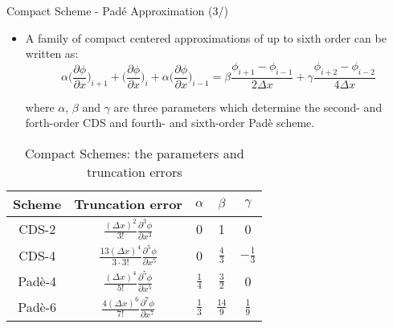 \begin{frame}{Compact Scheme - Pad\'e Approximation (3/)}

\begin{itemize}
    \item A family of compact centered approximations of up to sixth order can be written as:
    \[\alpha \bigg( \frac{\partial \phi}{\partial x}\bigg)_{i+1} + \bigg( \frac{\partial \phi}{\partial x}\bigg)_{i} + \alpha \bigg( \frac{\partial \phi}{\partial x}\bigg)_{i-1} = \beta \frac{\phi_{i+1}-\phi_{i-1}}{2\Delta x} + \gamma \frac{\phi_{i+2}-\phi_{i-2}}{4\Delta x}\]
    
    where $\alpha$, $\beta$ and $\gamma$ are three parameters which determine the second- and forth-order CDS and fourth- and sixth-order Pad\`e scheme.
\end{itemize}

\begin{table}[H]
    \centering
    \begin{tabular}{ccccc} \toprule
        Scheme      & Truncation error  & $\alpha$  & $\beta$   & $\gamma$ \\ \midrule
        CDS-2       & $\frac{(\Delta x)^{2}}{3!}\frac{\partial^{3}\phi}{\partial x^{3}}$    & 0 & 1 & 0 \\ [.5em]
        CDS-4       & $\frac{13(\Delta x)^{4}}{3 \cdot 3!}\frac{\partial^{5}\phi}{\partial x^{5}}$  & 0 & $\frac{4}{3}$ & $-\frac{1}{3}$ \\[.5em]
        Pad\`e-4    & $\frac{(\Delta x)^{4}}{5!}\frac{\partial^{5}\phi}{\partial x^{5}}$    & $\frac{1}{4}$ & $\frac{3}{2}$ & 0 \\[.5em]
        Pad\`e-6    & $\frac{4(\Delta x)^{6}}{7!}\frac{\partial^{7}\phi}{\partial x^{7}}$    & $\frac{1}{3}$ & $\frac{14}{9}$ & $\frac{1}{9}$ \\ \bottomrule
    \end{tabular}
    \caption{Compact Schemes: the parameters and truncation errors}
    \label{tab:my_label}
\end{table}
\end{frame}